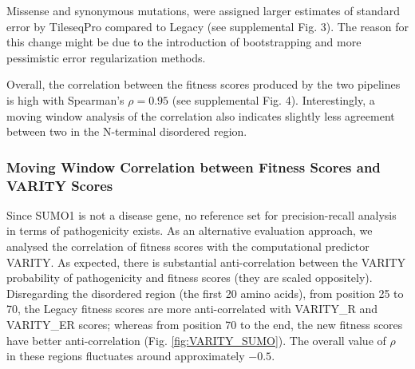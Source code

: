 \documentclass{article}
\begin{document}
Missense and synonymous mutations, were assigned larger estimates of standard error by TileseqPro compared to Legacy (see supplemental Fig. 3). The reason for this change might be due to the introduction of bootstrapping and more pessimistic error regularization methods.


Overall, the correlation between the fitness scores produced by the two  pipelines is high with Spearman's $\rho = 0.95$ (see supplemental Fig. 4). Interestingly, a moving window analysis of the correlation also indicates slightly less agreement between two in the N-terminal disordered region.


\subsubsection{Moving Window Correlation between Fitness Scores and VARITY Scores}
Since SUMO1 is not a disease gene, no reference set for precision-recall analysis in terms of pathogenicity exists. As an alternative evaluation approach, we analysed the correlation of fitness scores with the computational predictor VARITY\cite{wu_improved_2021}.  As expected, there is substantial anti-correlation between the VARITY probability of pathogenicity and fitness scores (they are scaled oppositely). Disregarding the disordered region (the first 20 amino acids), from position 25 to 70, the Legacy fitness scores are more anti-correlated with VARITY\_R and VARITY\_ER scores; whereas from position 70 to the end, the new fitness scores have better anti-correlation (Fig. \ref{fig:VARITY_SUMO}). The overall value of $\rho$ in these regions fluctuates around approximately $-0.5$.
\end{document}
